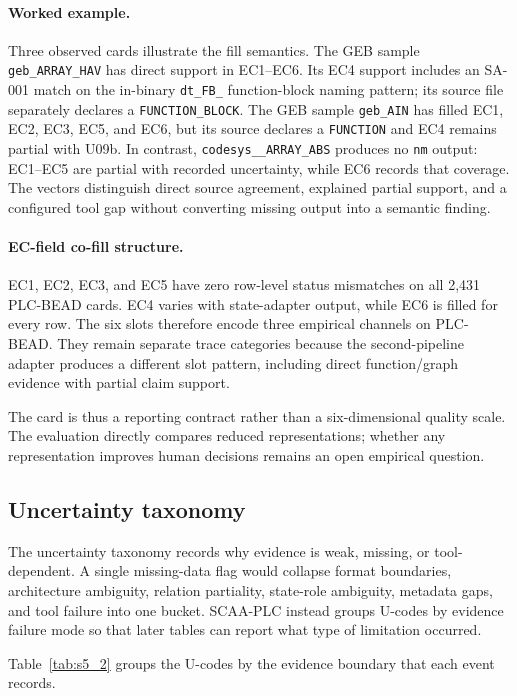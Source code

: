 \documentclass[manuscript,screen,review]{acmart}
\begin{document}
\paragraph{Worked example.} Three observed cards illustrate the fill semantics. The GEB sample \texttt{geb\_ARRAY\_HAV} has direct support in EC1--EC6. Its EC4 support includes an SA-001 match on the in-binary \texttt{dt\_FB\_} function-block naming pattern; its source file separately declares a \texttt{FUNCTION\_BLOCK}. The GEB sample \texttt{geb\_AIN} has filled EC1, EC2, EC3, EC5, and EC6, but its source declares a \texttt{FUNCTION} and EC4 remains partial with U09b. In contrast, \texttt{codesys\_\_ARRAY\_ABS} produces no \texttt{nm} output: EC1--EC5 are partial with recorded uncertainty, while EC6 records that coverage. The vectors distinguish direct source agreement, explained partial support, and a configured tool gap without converting missing output into a semantic finding.

\paragraph{EC-field co-fill structure.} EC1, EC2, EC3, and EC5 have zero row-level status mismatches on all 2{,}431 PLC-BEAD cards. EC4 varies with state-adapter output, while EC6 is filled for every row. The six slots therefore encode three empirical channels on PLC-BEAD. They remain separate trace categories because the second-pipeline adapter produces a different slot pattern, including direct function/graph evidence with partial claim support.

The card is thus a reporting contract rather than a six-dimensional quality scale. The evaluation directly compares reduced representations; whether any representation improves human decisions remains an open empirical question.

\subsection{Uncertainty taxonomy}

The uncertainty taxonomy records why evidence is weak, missing, or tool-dependent. A single missing-data flag would collapse format boundaries, architecture ambiguity, relation partiality, state-role ambiguity, metadata gaps, and tool failure into one bucket. SCAA-PLC instead groups U-codes by evidence failure mode so that later tables can report what type of limitation occurred.

Table~\ref{tab:s5_2} groups the U-codes by the evidence boundary that each event records.
\end{document}
